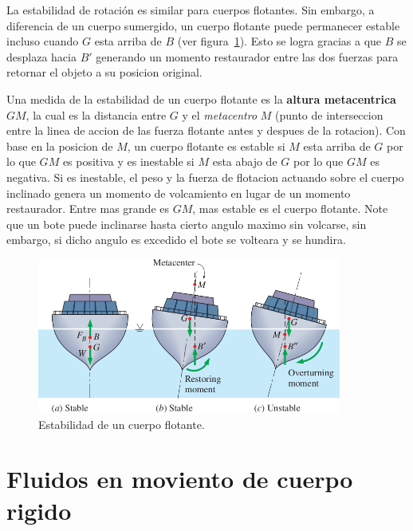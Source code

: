 \documentclass[10pt, oneside]{article}
\begin{document}
La estabilidad de rotaci\'on es similar para cuerpos flotantes. Sin embargo, a diferencia de un cuerpo sumergido, un cuerpo flotante puede permanecer estable incluso cuando $G$ esta arriba de $B$ (ver figura~\ref{rota3}). Esto se logra gracias a que $B$ se desplaza hacia $B'$ generando un momento restaurador entre las dos fuerzas para retornar el objeto a su posicion  original. 

Una medida de la estabilidad de un cuerpo flotante es la \textbf{altura metacentrica} $GM$, la cual es la distancia entre $G$ y el \emph{metacentro} $M$ (punto de interseccion entre la linea de accion de las fuerza flotante antes y despues de la rotacion). Con base en la posicion de $M$, un cuerpo flotante es estable si $M$ esta arriba de $G$ por lo que $GM$ es positiva y es inestable si $M$ esta abajo de $G$ por lo que $GM$ es negativa. Si es inestable, el peso y la fuerza de flotacion actuando sobre el cuerpo inclinado genera un momento de volcamiento en lugar de un momento restaurador. Entre mas grande es $GM$, mas estable es el cuerpo flotante. Note que un bote puede inclinarse hasta cierto angulo maximo sin volcarse, sin embargo, si dicho angulo es excedido el bote se volteara y se hundira.  
\begin{figure}[h]
\centering
\includegraphics[width=10cm]{rota3}
\caption{Estabilidad de un cuerpo flotante.}
\label{rota3}
\end{figure}


\section{Fluidos en moviento de cuerpo rigido}
\end{document}
